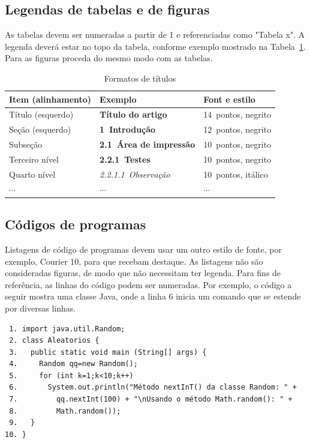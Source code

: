 \documentclass{RBCA}
\begin{document}
\subsection{Legendas de tabelas e de figuras}
As tabelas devem ser numeradas a partir de 1 e referenciadas como "Tabela x". A legenda deverá estar no topo da tabela, conforme exemplo mostrado na Tabela~\ref{tab:exemplo}. Para as figuras proceda do mesmo modo com as tabelas.

\begin{table}[ht]
\begin{center}
\caption{Formatos de títulos}
\label{tab:exemplo}
\begin{tabular}{lll}
    \hline
	Item (alinhamento) & Exemplo & Font e estilo\\
	\hline
	Título (esquerdo) & \Large\textbf{Título do artigo} & 14~pontos, negrito\\
	Seção (esquerdo) & \large\textbf{1~Introdução} & 12~pontos,	negrito\\
	Subseção & \textbf{2.1~Área de impressão} & 10~pontos,	negrito\\
	Terceiro nível & \textbf{2.2.1~Testes} & 10~pontos,	negrito\\
	Quarto nível & \emph{2.2.1.1~Observação} & 10~pontos,	itálico\\
	$\cdots$ & $\cdots$ & $\cdots$\\
	\hline
\end{tabular}
\end{center}
\end{table}

\subsection{Códigos de programas}
Listagens de código de programas devem usar um outro estilo de fonte, por exemplo, Courier 10, para que recebam destaque.  As listagens não são consideradas figuras, de modo que não necessitam ter legenda. Para fins de referência, as linhas do código podem  ser numeradas. Por exemplo, o código a seguir mostra uma classe Java, onde a linha 6 inicia um comando que se estende por diversas linhas.

\begin{verbatim}
 1. import java.util.Random;
 2. class Aleatorios {
 3.   public static void main (String[] args) {
 4.     Random qq=new Random();
 5.     for (int k=1;k<10;k++)
 6.       System.out.println("Método nextInT() da classe Random: " +
 7.         qq.nextInt(100) + "\nUsando o método Math.random(): " +
 8.         Math.random());
 9.   }
10. }
\end{verbatim}
\end{document}
